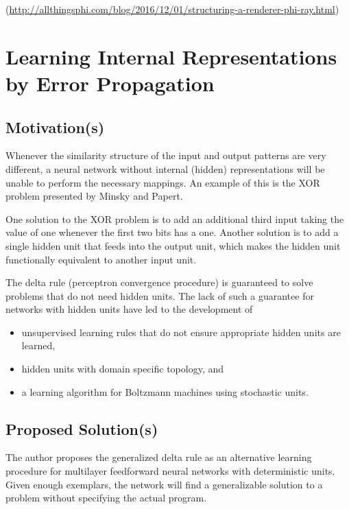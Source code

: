 \documentclass[]{article}
\date{}
\begin{document}
(\url{http://allthingsphi.com/blog/2016/12/01/structuring-a-renderer-phi-ray.html})

\section{Learning Internal Representations by Error
Propagation}\label{header-n3}

\subsection{Motivation(s)}\label{header-n4}

Whenever the similarity structure of the input and output patterns are
very different, a neural network without internal (hidden)
representations will be unable to perform the necessary mappings. An
example of this is the XOR problem presented by Minsky and Papert.

One solution to the XOR problem is to add an additional third input
taking the value of one whenever the first two bits has a one. Another
solution is to add a single hidden unit that feeds into the output unit,
which makes the hidden unit functionally equivalent to another input
unit.

The delta rule (perceptron convergence procedure) is guaranteed to solve
problems that do not need hidden units. The lack of such a guarantee for
networks with hidden units have led to the development of

\begin{itemize}
\item
  unsupervised learning rules that do not ensure appropriate hidden
  units are learned,
\item
  hidden units with domain specific topology, and
\item
  a learning algorithm for Boltzmann machines using stochastic units.
\end{itemize}

\subsection{Proposed Solution(s)}\label{header-n21}

The author proposes the generalized delta rule as an alternative
learning procedure for multilayer feedforward neural networks with
deterministic units. Given enough exemplars, the network will find a
generalizable solution to a problem without specifying the actual
program.
\end{document}
